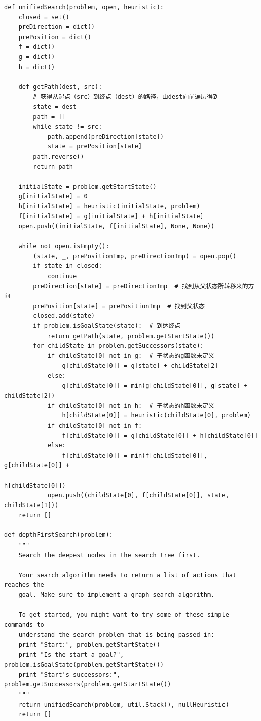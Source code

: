 \documentclass[forprint]{WHUBachelor}
\begin{document}
\begin{verbatim}
def unifiedSearch(problem, open, heuristic):
    closed = set()
    preDirection = dict()
    prePosition = dict()
    f = dict()
    g = dict()
    h = dict()

    def getPath(dest, src):
        # 获得从起点（src）到终点（dest）的路径，由dest向前遍历得到
        state = dest
        path = []
        while state != src:
            path.append(preDirection[state])
            state = prePosition[state]
        path.reverse()
        return path

    initialState = problem.getStartState()
    g[initialState] = 0
    h[initialState] = heuristic(initialState, problem)
    f[initialState] = g[initialState] + h[initialState]
    open.push((initialState, f[initialState], None, None))

    while not open.isEmpty():
        (state, _, prePositionTmp, preDirectionTmp) = open.pop()
        if state in closed:
            continue
        preDirection[state] = preDirectionTmp  # 找到从父状态所转移来的方向
        prePosition[state] = prePositionTmp  # 找到父状态
        closed.add(state)
        if problem.isGoalState(state):  # 到达终点
            return getPath(state, problem.getStartState())
        for childState in problem.getSuccessors(state):
            if childState[0] not in g:  # 子状态的g函数未定义
                g[childState[0]] = g[state] + childState[2]
            else:
                g[childState[0]] = min(g[childState[0]], g[state] + childState[2])
            if childState[0] not in h:  # 子状态的h函数未定义
                h[childState[0]] = heuristic(childState[0], problem)
            if childState[0] not in f:
                f[childState[0]] = g[childState[0]] + h[childState[0]]
            else:
                f[childState[0]] = min(f[childState[0]], g[childState[0]] +
                                                         h[childState[0]])
            open.push((childState[0], f[childState[0]], state, childState[1]))
    return []

def depthFirstSearch(problem):
    """
    Search the deepest nodes in the search tree first.

    Your search algorithm needs to return a list of actions that reaches the
    goal. Make sure to implement a graph search algorithm.

    To get started, you might want to try some of these simple commands to
    understand the search problem that is being passed in:
    print "Start:", problem.getStartState()
    print "Is the start a goal?", problem.isGoalState(problem.getStartState())
    print "Start's successors:", problem.getSuccessors(problem.getStartState())
    """
    return unifiedSearch(problem, util.Stack(), nullHeuristic)
    return []


\end{verbatim}
\end{document}
